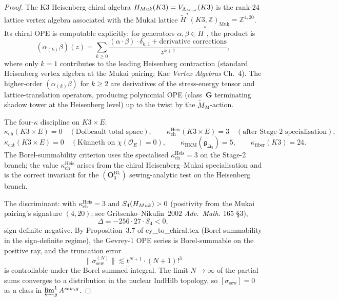 \documentclass[11pt]{amsart}
\newcommand{\kch}{\kappa_{\mathrm{ch}}}
\newcommand{\kcat}{\kappa_{\mathrm{cat}}}
\newcommand{\kBKM}{\kappa_{\mathrm{BKM}}}
\newcommand{\kfib}{\kappa_{\mathrm{fiber}}}
\newcommand{\cO}{\mathcal{O}}
\newcommand{\bZ}{\mathbb{Z}}
\begin{document}
\begin{proof}
The K3 Heisenberg chiral algebra
$\cH_{\mathrm{Muk}}(K3) = V_{\Lambda_{\mathrm{Muk}}}(K3)$ is the
rank-$24$ lattice vertex algebra associated with the Mukai lattice
$\widetilde H^*(K3, \bZ)_{\mathrm{Muk}} = \bZ^{4, 20}$. Its chiral
OPE is computable explicitly: for generators $\alpha, \beta \in
\widetilde H^*$, the product is
\[
(\alpha_{(k)} \beta)(z) = \sum_{k \geq 0} \frac{(\alpha \cdot \beta)
\cdot \delta_{k, 1} + \text{derivative corrections}}{z^{k+1}},
\]
where only $k = 1$ contributes to the leading Heisenberg contraction
(standard Heisenberg vertex algebra at the Mukai pairing; Kac
\emph{Vertex Algebras} Ch.~$4$). The higher-order
$(\alpha_{(k)} \beta)$ for $k \geq 2$ are derivatives of the
stress-energy tensor and lattice-translation operators, producing
polynomial OPE (class~$\mathbf{G}$ terminating shadow tower at the
Heisenberg level) up to the twist by the $\widetilde M_{24}$-action.

The four-$\kappa$ discipline on $K3 \times E$:
\[
\kch(K3 \times E) = 0 \quad (\text{Dolbeault total space}),\qquad
\kch^{\mathrm{Heis}}(K3 \times E) = 3 \quad
(\text{after Stage-2 specialisation}),
\]
\[
\kcat(K3 \times E) = 0 \quad (\text{Künneth on } \chi(\cO_E) = 0),\qquad
\kBKM(\mathfrak{g}_{\Delta_5}) = 5,\qquad
\kfib(K3) = 24.
\]
The Borel-summability criterion uses the specialised
$\kch^{\mathrm{Heis}} = 3$ on the Stage-2 branch; the value
$\kch^{\mathrm{Heis}}$ arises from the chiral Heisenberg--Mukai
specialisation and is the correct invariant for the
$(\mathbf{O}_3^{\mathrm{BL}})$ sewing-analytic test on the
Heisenberg branch.

The discriminant: with $\kch^{\mathrm{Heis}} = 3$ and
$S_4(\cH_{\mathrm{Muk}}) > 0$ (positivity from the Mukai pairing's
signature $(4, 20)$; see Gritsenko--Nikulin~$2002$ \emph{Adv.\
Math.} 165 \S $3$),
\[
\Delta = -256 \cdot 27 \cdot S_4 < 0,
\]
sign-definite negative. By Proposition~$3.7$ of cy\_to\_chiral.tex
(Borel summability in the sign-definite regime), the Gevrey-$1$
OPE series is Borel-summable on the positive ray, and the truncation
error
\[
\|\sigma^{(N)}_{\mathrm{sew}}\| \lesssim t^{N+1} \cdot (N+1)!^3
\]
is controllable under the Borel-summed integral. The limit $N \to
\infty$ of the partial sums converges to a distribution in the
nuclear IndHilb topology, so $[\sigma_{\mathrm{sew}}] = 0$ as a
class in $\varprojlim^1_g A^{\mathrm{sew}, g}$.
\end{proof}
\end{document}
